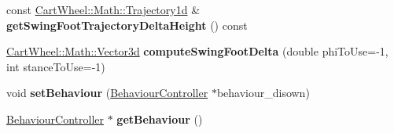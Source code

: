 \begin{DoxyCompactItemize}
\item 
\hypertarget{classCartWheel_1_1Core_1_1IKVMCController_ac9864ebfbc0ca31a8ef18f753585a73f}{
const \hyperlink{classCartWheel_1_1Math_1_1GenericTrajectory}{CartWheel::Math::Trajectory1d} \& {\bfseries getSwingFootTrajectoryDeltaHeight} () const }
\label{classCartWheel_1_1Core_1_1IKVMCController_ac9864ebfbc0ca31a8ef18f753585a73f}

\item 
\hypertarget{classCartWheel_1_1Core_1_1IKVMCController_a74e16de1da5ee0d52d95f5fc6f3f4fb8}{
\hyperlink{classCartWheel_1_1Math_1_1Vector3d}{CartWheel::Math::Vector3d} {\bfseries computeSwingFootDelta} (double phiToUse=-\/1, int stanceToUse=-\/1)}
\label{classCartWheel_1_1Core_1_1IKVMCController_a74e16de1da5ee0d52d95f5fc6f3f4fb8}

\item 
\hypertarget{classCartWheel_1_1Core_1_1IKVMCController_a2b1aed3a29b4d45288df94296964b3ad}{
void {\bfseries setBehaviour} (\hyperlink{classCartWheel_1_1Core_1_1BehaviourController}{BehaviourController} $\ast$behaviour\_\-disown)}
\label{classCartWheel_1_1Core_1_1IKVMCController_a2b1aed3a29b4d45288df94296964b3ad}

\item 
\hypertarget{classCartWheel_1_1Core_1_1IKVMCController_a1a76745bb0f74ca498b815f4bd51ee8e}{
\hyperlink{classCartWheel_1_1Core_1_1BehaviourController}{BehaviourController} $\ast$ {\bfseries getBehaviour} ()}
\label{classCartWheel_1_1Core_1_1IKVMCController_a1a76745bb0f74ca498b815f4bd51ee8e}


\end{DoxyCompactItemize}
